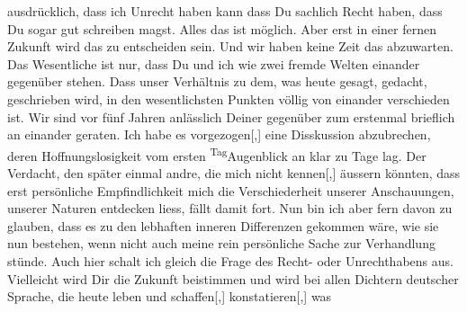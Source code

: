                ausdrücklich, dass ich Unrecht haben kann\label{T_L03520-11v}\label{T_L03520-11h} dass Du
               sachlich Recht
               haben, dass Du sogar gut schreiben magst. Alles das ist möglich. Aber erst in einer
               fernen Zukunft wird das zu entscheiden sein. Und wir haben keine Zeit das abzuwarten.
               Das Wesentliche ist nur, dass Du und ich wie zwei fremde Welten einander gegenüber
               stehen. Dass unser Verhältnis zu dem, was heute gesagt, gedacht, geschrieben wird, in
               den wesentlichsten Punkten völlig von einander verschieden ist. Wir sind vor fünf {\pb}Jahren anlässlich Deiner \label{K_L03520-3v}\label{K_L03520-3h} gegenüber zum erstenmal brieflich an einander geraten. Ich habe es
                  vorgezogen{[},{]} eine Disskussion abzubrechen, deren
               Hoffnungslosigkeit vom ersten \substVorne{}\textsuperscript{Tag}\substDazwischen{}Augenblick\substHinten{} an klar zu Tage lag. Der Verdacht, den später einmal andre, die mich nicht
                  kennen{[},{]} äussern könnten, dass erst persönliche
               Empfindlichkeit mich die Verschiederheit unserer Anschauungen\introOben{},\introOben{} unserer Naturen entdecken liess, fällt damit fort. Nun bin ich aber fern
               davon zu glauben, dass es zu den lebhaften inneren Differenzen gekommen wäre, wie sie
               nun bestehen, wenn nicht auch meine rein persönliche Sache zur Verhandlung stünde.
               Auch hier schalt ich gleich die Frage des Recht- oder Unrechthabens aus. Vielleicht
               wird Dir die Zukunft beistimmen und wird bei allen Dichtern deutscher Sprache, die
               heute leben und schaffen{[},{]} konstatieren{[},{]} was
